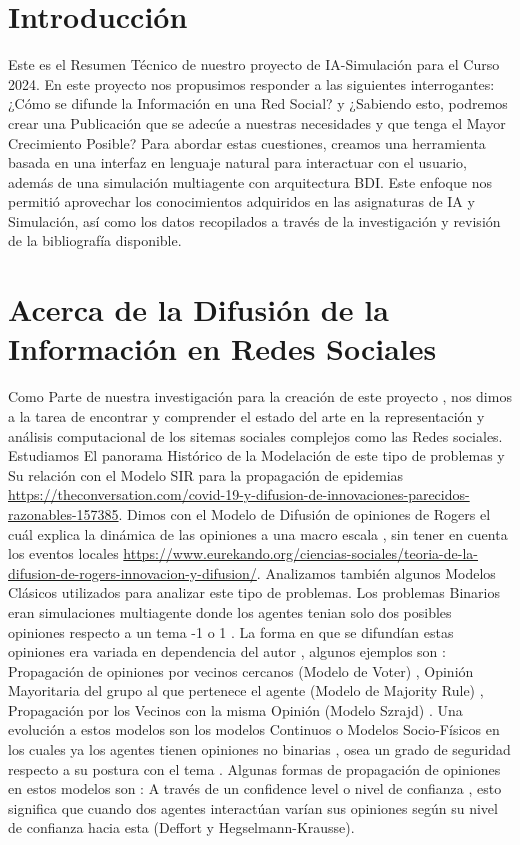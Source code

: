 \documentclass[acmtog]{acmart}
\begin{document}
\section{Introducción}
Este es el Resumen Técnico de nuestro proyecto de IA-Simulación para el Curso 2024. En este proyecto nos propusimos responder a las siguientes interrogantes: ¿Cómo se difunde la Información en una Red Social? y ¿Sabiendo esto, podremos crear una Publicación que se adecúe a nuestras necesidades y que tenga el Mayor Crecimiento Posible? Para abordar estas cuestiones, creamos una herramienta basada en una interfaz en lenguaje natural para interactuar con el usuario, además de una simulación multiagente con arquitectura BDI. Este enfoque nos permitió aprovechar los conocimientos adquiridos en las asignaturas de IA y Simulación, así como los datos recopilados a través de la investigación y revisión de la bibliografía disponible.

\section{Acerca de la Difusión de la Información en Redes Sociales}
Como Parte de nuestra investigación para la creación de este proyecto , nos dimos a la tarea de encontrar y comprender el estado del arte en la representación y análisis computacional de los sitemas sociales complejos como las Redes sociales. Estudiamos El panorama Histórico de la Modelación de este tipo de problemas y Su relación con el Modelo SIR para la propagación de epidemias \url{https://theconversation.com/covid-19-y-difusion-de-innovaciones-parecidos-razonables-157385}. Dimos con el Modelo de Difusión de opiniones de Rogers el cuál explica la dinámica de las opiniones a una macro escala , sin tener en cuenta los eventos locales \url{https://www.eurekando.org/ciencias-sociales/teoria-de-la-difusion-de-rogers-innovacion-y-difusion/}. Analizamos también algunos Modelos Clásicos utilizados para analizar este tipo de problemas. Los problemas Binarios eran simulaciones multiagente donde los agentes tenian solo dos posibles opiniones respecto a un tema -1 o 1 . La forma en que se difundían estas opiniones era variada en dependencia del autor , algunos ejemplos son : Propagación de opiniones por vecinos cercanos (Modelo de Voter) , Opinión Mayoritaria del grupo al que pertenece el agente (Modelo de Majority Rule) , Propagación por los Vecinos con la misma Opinión (Modelo Szrajd) . Una evolución a estos modelos son los modelos Continuos o Modelos Socio-Físicos en los cuales ya los agentes tienen opiniones no binarias , osea un grado de seguridad respecto a su postura con el tema . Algunas formas de propagación de opiniones en estos modelos son : A través de un confidence level o nivel de confianza , esto significa que cuando dos agentes interactúan varían sus opiniones según su nivel de confianza hacia esta (Deffort y Hegselmann-Krausse). 
\end{document}
